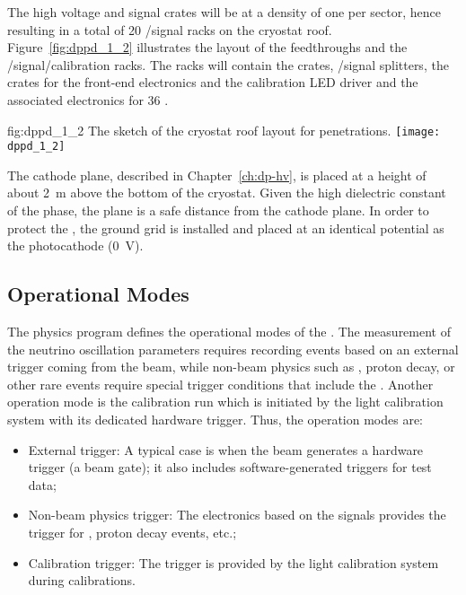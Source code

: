 The high voltage and signal crates will be at a density of one per sector, hence resulting in a total of \num{20} /signal racks on the cryostat roof. Figure~\ref{fig:dppd_1_2} illustrates the layout of the feedthroughs and the /signal/calibration racks. The racks will contain the  crates, /signal splitters, the  crates for the front-end electronics and the calibration LED driver and the associated electronics for \num{36} .

\begin{dunefigure}{fig:dppd_1_2}
{The sketch of the cryostat roof layout for \dual {} penetrations.}
\texttt{[image: dppd\_1\_2]}
\end{dunefigure}

The cathode plane, described in Chapter~\ref{ch:dp-hv}, is placed at a height of about \SI{2}{m} above the bottom of the cryostat. Given the high dielectric constant of the \lar phase, the  plane is a safe distance from the cathode plane. In order to protect the , the ground grid is installed and placed at an identical potential as the  photocathode (\SI{0}{V}).

\subsection{Operational Modes} %
\label{sec:dp-pds-oveerview_operation}

The physics program defines the operational modes of the \dual {}. The measurement of the neutrino oscillation parameters requires recording events based on an external trigger coming from the beam, while non-beam physics such as , proton decay, or other rare events require special trigger conditions that include the . Another operation mode is the  calibration run which is initiated by the light calibration system with its dedicated hardware trigger.
%
Thus, the operation modes are:
\begin{itemize}
\item External trigger: %
A typical case is when the beam generates a hardware trigger (a beam gate);  it also includes software-generated triggers for test data;
\item Non-beam physics trigger: The electronics based on the  signals provides the trigger for , proton decay events, etc.;
\item Calibration trigger: The trigger is provided by the light calibration system during  calibrations.
\end{itemize}


